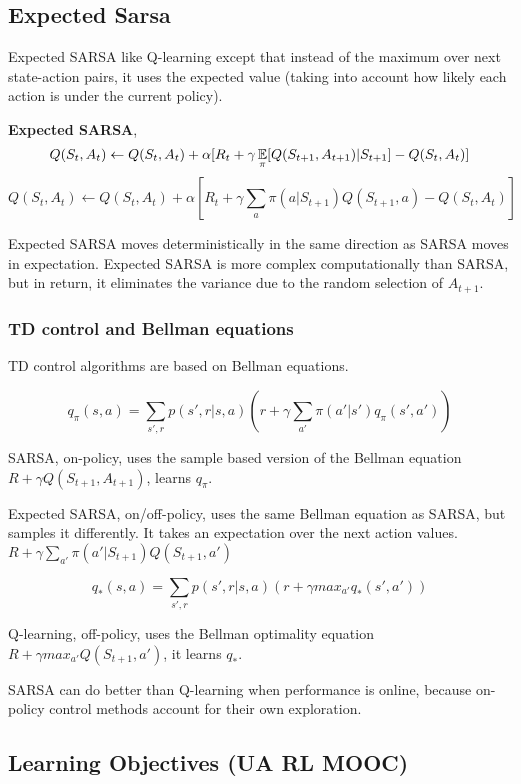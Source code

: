 \documentclass[sutton_barto_notes.tex]{subfiles}
\begin{document}
\subsection{Expected Sarsa}

Expected SARSA like Q-learning except that instead of the maximum over next state-action pairs, it uses the expected value (taking into account how likely each action is under the current policy).

\begin{definition}
\textbf{Expected SARSA},
$$Q(S_t, A_t)\leftarrow Q(S_t, A_t) + \alpha [R_t + \gamma \operatorname*{\mathbb{E}}_\pi [Q(S_{t+1}, A_{t+1})|S_{t+1}] - Q(S_t, A_t)]$$
$$Q(S_t, A_t)\leftarrow Q(S_t, A_t) + \alpha [R_t + \gamma \sum_a \pi(a|S_{t+1})Q(S_{t+1},a) - Q(S_t, A_t)]$$
\end{definition}

Expected SARSA moves deterministically in the same direction as SARSA moves in expectation.
Expected SARSA is more complex computationally than SARSA, but in return, it eliminates the variance due to the random selection of $A_{t+1}$.

\subsubsection{TD control and Bellman equations}

TD control algorithms are based on Bellman equations.

$$q_\pi(s,a) = \sum_{s',r} p(s',r|s,a) (r + \gamma \sum_{a'} \pi(a'|s')q_\pi(s',a'))$$

SARSA, on-policy, uses the sample based version of the Bellman equation $R + \gamma Q(S_{t+1}, A_{t+1})$, learns $q_\pi$.

Expected SARSA, on/off-policy, uses the same Bellman equation as SARSA, but samples it differently. It takes an expectation over the next action values. $R+\gamma\sum_{a'}\pi(a'|S_{t+1})Q(S_{t+1},a')$

$$q_*(s,a) = \sum_{s',r} p(s',r|s,a) (r+\gamma max_{a'} q_* (s',a'))$$

Q-learning, off-policy, uses the Bellman optimality equation $R + \gamma max_{a'} Q(S_{t+1},a')$, it learns $q_*$.

SARSA can do better than Q-learning when performance is online, because on-policy control methods account for their own exploration.

\subsection{Learning Objectives (UA RL MOOC)}
\end{document}
